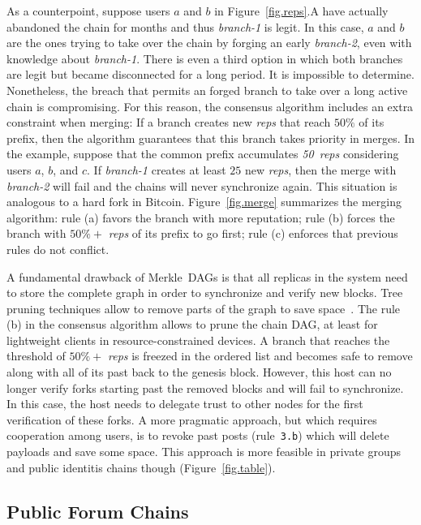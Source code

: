 \documentclass[10pt,journal,compsoc]{IEEEtran}
\newcommand{\reps}     {\emph{reps}\xspace}
\newcommand{\nreps}[1] {\emph{#1~reps\xspace}}
\begin{document}
As a counterpoint, suppose users $a$ and $b$ in Figure~\ref{fig.reps}.A have
actually abandoned the chain for months and thus \emph{branch-1} is legit.
In this case, $a$ and $b$ are the ones trying to take over the chain by
forging an early \emph{branch-2}, even with knowledge about \emph{branch-1}.
There is even a third option in which both branches are legit but became
disconnected for a long period.
It is impossible to determine.
Nonetheless, the breach that permits an forged branch to take over a long
active chain is compromising.
For this reason, the consensus algorithm includes an extra constraint when
merging:
If a branch creates new \reps that reach $50\%$ of its prefix, then the
algorithm guarantees that this branch takes priority in merges.
In the example, suppose that the common prefix accumulates \nreps{50}
considering users $a$, $b$, and $c$.
If \emph{branch-1} creates at least $25$ new \reps, then the merge with
\emph{branch-2} will fail and the chains will never synchronize again.
This situation is analogous to a hard fork in Bitcoin.
%
Figure~\ref{fig.merge} summarizes the merging algorithm:
    rule (a) favors the branch with more reputation;
    rule (b) forces the branch with $50\%+$ \reps of its prefix to go first;
    rule (c) enforces that previous rules do not conflict.

A fundamental drawback of Merkle~DAGs is that all replicas in the system need
to store the complete graph in order to synchronize and verify new blocks.
Tree pruning techniques allow to remove parts of the graph to save
space~\cite{p2p.prune}.
The rule (b) in the consensus algorithm allows to prune the chain DAG, at least
for lightweight clients in resource-constrained devices.
A branch that reaches the threshold of $50\%+$ \reps is freezed in the ordered
list and becomes safe to remove along with all of its past back to the genesis
block.
However, this host can no longer verify forks starting past the removed blocks
and will fail to synchronize.
In this case, the host needs to delegate trust to other nodes for the first
verification of these forks.
A more pragmatic approach, but which requires cooperation among users, is to
revoke past posts (rule~\texttt{3.b}) which will delete payloads and save some
space.
This approach is more feasible in private groups and public identitis chains
though (Figure~\ref{fig.table}).

\subsection{Public Forum Chains}
\label{sec.consensus.chains}
\end{document}
